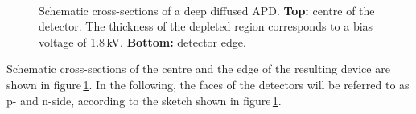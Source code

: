 \documentclass[3p,preprint,twocolumn]{elsarticle}
\begin{document}
\begin{figure}
  \centering
  \\
  \caption{Schematic cross-sections of a deep diffused APD. {\bf Top:} centre of the detector. The thickness of the depleted region corresponds to a bias voltage of 1.8\,kV. {\bf Bottom:} detector edge.}
  \label{fig:apdDia}
\end{figure}

Schematic cross-sections of the centre and the edge of the resulting device are shown in figure\,\ref{fig:apdDia}.
In the following, the faces of the detectors will be referred to as p- and n-side, according to the sketch shown in figure\,\ref{fig:apdDia}.
\end{document}

